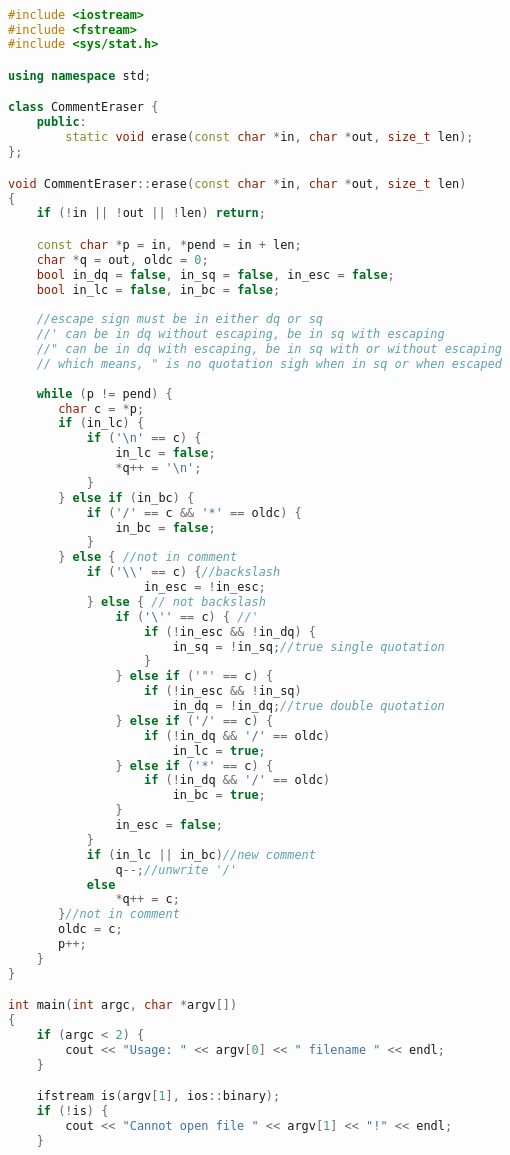 \begin{lstlisting}[language=C++]

#include <iostream>
#include <fstream>
#include <sys/stat.h>

using namespace std;

class CommentEraser {
    public:
        static void erase(const char *in, char *out, size_t len);
};

void CommentEraser::erase(const char *in, char *out, size_t len)
{
    if (!in || !out || !len) return;

    const char *p = in, *pend = in + len;
    char *q = out, oldc = 0;
    bool in_dq = false, in_sq = false, in_esc = false;
    bool in_lc = false, in_bc = false;
    
    //escape sign must be in either dq or sq
    //' can be in dq without escaping, be in sq with escaping
    //" can be in dq with escaping, be in sq with or without escaping
    // which means, " is no quotation sigh when in sq or when escaped
    
    while (p != pend) {
       char c = *p; 
       if (in_lc) {
           if ('\n' == c) {
               in_lc = false;
               *q++ = '\n';
           }
       } else if (in_bc) {
           if ('/' == c && '*' == oldc) {
               in_bc = false;
           }
       } else { //not in comment
           if ('\\' == c) {//backslash
                   in_esc = !in_esc;
           } else { // not backslash 
               if ('\'' == c) { //'
                   if (!in_esc && !in_dq) {
                       in_sq = !in_sq;//true single quotation
                   }
               } else if ('"' == c) {
                   if (!in_esc && !in_sq)
                       in_dq = !in_dq;//true double quotation
               } else if ('/' == c) {
                   if (!in_dq && '/' == oldc)
                       in_lc = true;
               } else if ('*' == c) {
                   if (!in_dq && '/' == oldc)
                       in_bc = true;
               }
               in_esc = false;
           }
           if (in_lc || in_bc)//new comment 
               q--;//unwrite '/'
           else
               *q++ = c;
       }//not in comment
       oldc = c;
       p++;
    }
}

int main(int argc, char *argv[])
{
    if (argc < 2) {
        cout << "Usage: " << argv[0] << " filename " << endl;
    }

    ifstream is(argv[1], ios::binary);
    if (!is) {
        cout << "Cannot open file " << argv[1] << "!" << endl;
    }
    

\end{lstlisting}

